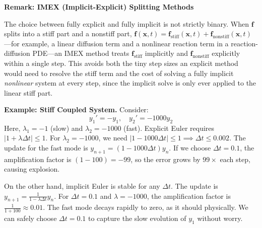 \begin{optionalBox}
    \textbf{Remark: IMEX (Implicit-Explicit) Splitting Methods}

    The choice between fully explicit and fully implicit is not strictly binary. When $\mathbf{f}$ splits into a stiff part and a nonstiff part, $\mathbf{f}(\mathbf{x},t) = \mathbf{f}_{\text{stiff}}(\mathbf{x},t) + \mathbf{f}_{\text{nonstiff}}(\mathbf{x},t)$---for example, a linear diffusion term and a nonlinear reaction term in a reaction-diffusion PDE---an IMEX method treats $\mathbf{f}_{\text{stiff}}$ implicitly and $\mathbf{f}_{\text{nonstiff}}$ explicitly within a single step. This avoids both the tiny step sizes an explicit method would need to resolve the stiff term and the cost of solving a fully implicit \emph{nonlinear} system at every step, since the implicit solve is only ever applied to the linear stiff part.
\end{optionalBox}

\begin{exampleBox}
    \textbf{Example: Stiff Coupled System.}
    Consider:
    \begin{equation}
        y_1' = -y_1, \quad y_2' = -1000 y_2
    \end{equation}
    Here, $\lambda_1 = -1$ (slow) and $\lambda_2 = -1000$ (fast). Explicit Euler requires $|1 + \lambda \Delta t| \le 1$. For $\lambda_2 = -1000$, we need $|1 - 1000 \Delta t| \le 1 \implies \Delta t \le 0.002$. The update for the fast mode is $y_{n+1} = (1 - 1000 \Delta t)y_n$. If we choose $\Delta t=0.1$, the amplification factor is $(1 - 100) = -99$, so the error grows by $99\times$ each step, causing explosion.

    On the other hand, implicit Euler is stable for any $\Delta t$. The update is $y_{n+1} = \frac{1}{1 - \lambda \Delta t} y_n$. For $\Delta t = 0.1$ and $\lambda = -1000$, the amplification factor is $\frac{1}{1 + 100} \approx 0.01$. The fast mode decays rapidly to zero, as it should physically. We can safely choose $\Delta t = 0.1$ to capture the slow evolution of $y_1$ without worry.
\end{exampleBox}

